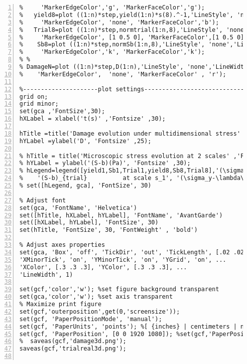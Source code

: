 \begin{lstlisting}[numbers=left, numberstyle=\tiny, keywordstyle=\color{blue!100}, commentstyle=\color{red!30!green!100!blue!100}, frame=shadowbox, rulesepcolor=\color{red!20!green!20!blue!20}]
%     Sb1=plot ((1:n)*step,normSb(1:n,1),'LineStyle', 'none','LineWidth', 1,'Marker', 'v', 'MarkerSize', 6, ...
%     'MarkerEdgeColor','g', 'MarkerFaceColor','g');
%   yield8=plot ((1:n)*step,yield(1:n)*s(8).^-1,'LineStyle', 'none','LineWidth', 1,'Marker', 'o', 'MarkerSize', 6, ...
%     'MarkerEdgeColor', 'none', 'MarkerFaceColor','b');
%   Trial8=plot ((1:n)*step,normtrial(1:n,8),'LineStyle', 'none','LineWidth', 1,'Marker', '^', 'MarkerSize', 6, ...
%     'MarkerEdgeColor', [1 0.5 0], 'MarkerFaceColor',[1 0.5 0]);
%    Sb8=plot ((1:n)*step,normSb(1:n,8),'LineStyle', 'none','LineWidth', 1,'Marker', 'v', 'MarkerSize', 6, ...
%     'MarkerEdgeColor','k', 'MarkerFaceColor','k');
% % 
% DamageN=plot ((1:n)*step,D(1:n),'LineStyle', 'none','LineWidth', 1, 'Marker', 'o', 'MarkerSize', 6, ...
%    'MarkerEdgeColor',  'none', 'MarkerFaceColor' , 'r');

%---------------------plot settings-----------------------------
grid on;
grid minor;
set(gca ,'FontSize',30);
hXLabel = xlabel('t(s)' ,'Fontsize' ,30);

hTitle =title('Damage evolution under multidimensional stress' ,'Fontsize' ,25);
hYLabel =ylabel('D', 'Fontsize' ,25);

% hTitle = title('Microscopic stress evolution at 2 scales' ,'Fontsize' ,30);
% hYLabel = ylabel('(S-b)(Pa)', 'Fontsize' ,30);
% hLegend=legend([yield1,Sb1,Trial1,yield8,Sb8,Trial8],'(\sigma_y-\lambda\Sigma_H)/s_1     at scale s_1','(S-b)               at scale s_1',...
%    '(S-b)_{trial}          at scale s_1', '(\sigma_y-\lambda\Sigma_H)/s_8     at scale s_{8}','(S-b)               at scale s_{8}','(S-b)_{trial}          at scale s_{8}');
% set([hLegend, gca], 'FontSize', 30)

% Adjust font
set(gca, 'FontName', 'Helvetica')
set([hTitle, hXLabel, hYLabel], 'FontName', 'AvantGarde')
set([hXLabel, hYLabel], 'FontSize', 30)
set(hTitle, 'FontSize', 30, 'FontWeight' , 'bold')

% Adjust axes properties
set(gca, 'Box', 'off', 'TickDir', 'out', 'TickLength', [.02 .02], ...
'XMinorTick', 'on', 'YMinorTick', 'on', 'YGrid', 'on', ...
'XColor', [.3 .3 .3], 'YColor', [.3 .3 .3], ...
'LineWidth', 1)

set(gcf,'color','w'); %set figure background transparent
set(gca,'color','w'); %set axis transparent
% Maximize print figure
set(gcf,'outerposition',get(0,'screensize'));
set(gcf, 'PaperPositionMode', 'manual');
set(gcf, 'PaperUnits', 'points'); %[ {inches} | centimeters | normalized | points ]
set(gcf, 'PaperPosition', [0 0 1920 1080]); %set(gcf,'PaperPosition',[left,bottom,width,height])
%  saveas(gcf,'damage3d.png');
saveas(gcf,'trialreal3d.png');


\end{lstlisting}


